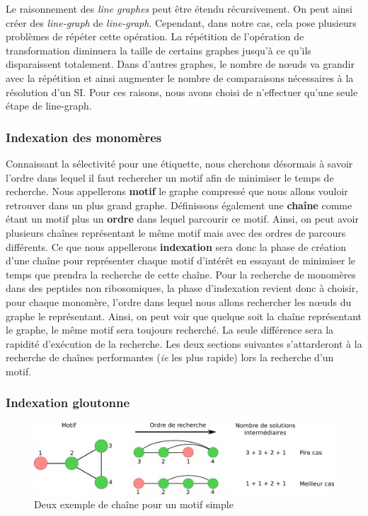 Le raisonnement des \textit{line graphes} peut être étendu récursivement.
On peut ainsi créer des \textit{line-graph} de \textit{line-graph}.
Cependant, dans notre cas, cela pose plusieurs problèmes de répéter cette opération.
La répétition de l'opération de transformation diminuera la taille de certains graphes jusqu'à ce qu'ils disparaissent totalement.
Dans d'autres graphes, le nombre de n\oe{}uds va grandir avec la répétition et ainsi augmenter le nombre de comparaisons nécessaires à la résolution d'un SI.
Pour ces raisons, nous avons choisi de n'effectuer qu'une seule étape de line-graph.

\subsubsection{Indexation des monomères}

\label{index_p}

Connaissant la sélectivité pour une étiquette, nous cherchons désormais à savoir l'ordre dans lequel il faut rechercher un motif afin de minimiser le temps de recherche.
Nous appellerons \textbf{motif} le graphe compressé que nous allons vouloir retrouver dans un plus
grand graphe. Définissons également une \textbf{chaîne} comme étant un motif plus un \textbf{ordre} dans lequel parcourir ce motif.
Ainsi, on peut avoir plusieurs chaînes représentant le même motif mais avec des ordres de parcours différents.
Ce que nous appellerons \textbf{indexation} sera donc la phase de création d'une chaîne pour représenter chaque motif d'intérêt en essayant de minimiser le temps que prendra la recherche de cette chaîne.
Pour la recherche de monomères dans des peptides non ribosomiques, la phase d'indexation revient donc à choisir, pour chaque monomère, l'ordre dans lequel nous allons rechercher les n\oe{}uds du graphe le représentant.
Ainsi, on peut voir que quelque soit la chaîne représentant le graphe, le même motif sera toujours recherché.
La seule différence sera la rapidité d'exécution de la recherche.
Les deux sections suivantes s'attarderont à la recherche de chaînes performantes (\textit{ie} les plus rapide) lors la recherche d'un motif.


\subsubsection{Indexation gloutonne}

\begin{figure}[!ht]
  \begin{center}
    \includegraphics[width=450px]{Figures/s2m/indexation/chaines_example.png}
    \caption{\label{chaine_fail}Deux exemple de chaîne pour un motif simple}
  \end{center}
\end{figure}

